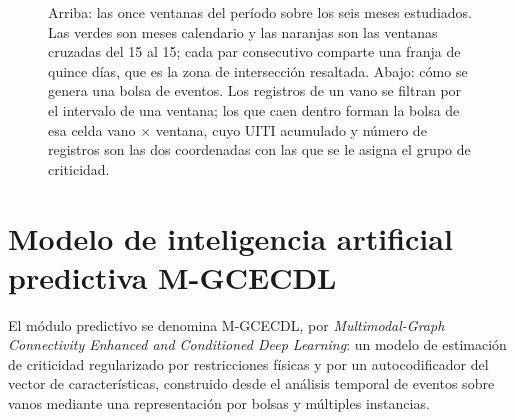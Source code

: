 \documentclass[11pt,a4paper]{article}
\begin{document}
\begin{bloquenuevo}
\begin{figure}[H]
\begin{tikzpicture}[x=1.95cm, y=1cm, font=\scriptsize]
\end{tikzpicture}

\vspace{5mm}


\caption{Arriba: las once ventanas del período sobre los seis meses estudiados. Las verdes son
meses calendario y las naranjas son las ventanas cruzadas del 15 al 15; cada par consecutivo
comparte una franja de quince días, que es la zona de intersección resaltada. Abajo: cómo se
genera una bolsa de eventos. Los registros de un vano se filtran por el intervalo de una
ventana; los que caen dentro forman la bolsa de esa celda vano $\times$ ventana, cuyo UITI
acumulado y número de registros son las dos coordenadas con las que se le asigna el grupo de
criticidad.}
\label{fig:ventanas}
\end{figure}
\end{bloquenuevo}

\section{Modelo de inteligencia artificial predictiva M-GCECDL}
\label{sec:modelo}

El módulo predictivo se denomina M-GCECDL, por \emph{Multimodal-Graph Connectivity Enhanced
and Conditioned Deep Learning}: un modelo de estimación de criticidad regularizado por
restricciones físicas y por un autocodificador del vector de características, construido desde
el análisis temporal de eventos sobre vanos mediante una representación por bolsas y múltiples
instancias.
\end{document}
